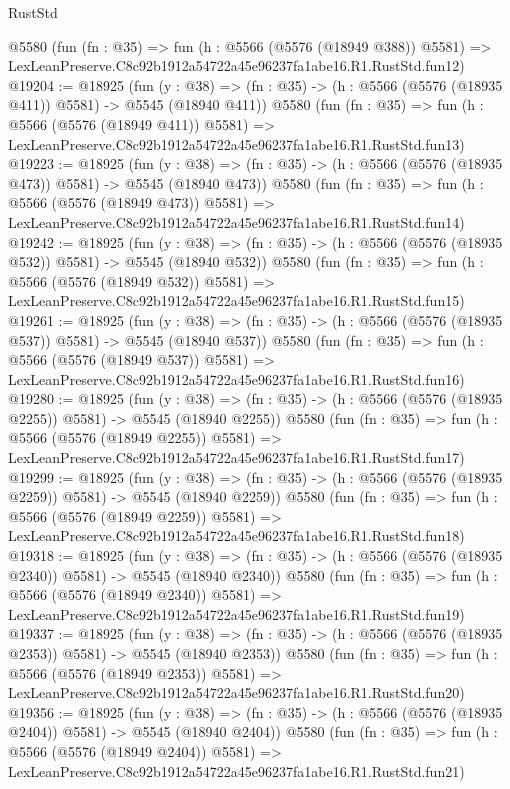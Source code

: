 \begin{lexlean}{RustStd}
\begin{coremodule}
    @5580
    (fun (fn : @35) =>
    fun (h : @5566 (@5576 (@18949 @388)) @5581) =>
    LexLeanPreserve.C8c92b1912a54722a45e96237fa1abe16.R1.RustStd.fun12)
@19204 := @18925
    (fun (y : @38) => (fn : @35) -> (h : @5566 (@5576 (@18935 @411)) @5581) -> @5545 (@18940 @411))
    @5580
    (fun (fn : @35) =>
    fun (h : @5566 (@5576 (@18949 @411)) @5581) =>
    LexLeanPreserve.C8c92b1912a54722a45e96237fa1abe16.R1.RustStd.fun13)
@19223 := @18925
    (fun (y : @38) => (fn : @35) -> (h : @5566 (@5576 (@18935 @473)) @5581) -> @5545 (@18940 @473))
    @5580
    (fun (fn : @35) =>
    fun (h : @5566 (@5576 (@18949 @473)) @5581) =>
    LexLeanPreserve.C8c92b1912a54722a45e96237fa1abe16.R1.RustStd.fun14)
@19242 := @18925
    (fun (y : @38) => (fn : @35) -> (h : @5566 (@5576 (@18935 @532)) @5581) -> @5545 (@18940 @532))
    @5580
    (fun (fn : @35) =>
    fun (h : @5566 (@5576 (@18949 @532)) @5581) =>
    LexLeanPreserve.C8c92b1912a54722a45e96237fa1abe16.R1.RustStd.fun15)
@19261 := @18925
    (fun (y : @38) => (fn : @35) -> (h : @5566 (@5576 (@18935 @537)) @5581) -> @5545 (@18940 @537))
    @5580
    (fun (fn : @35) =>
    fun (h : @5566 (@5576 (@18949 @537)) @5581) =>
    LexLeanPreserve.C8c92b1912a54722a45e96237fa1abe16.R1.RustStd.fun16)
@19280 := @18925
    (fun (y : @38) =>
    (fn : @35) -> (h : @5566 (@5576 (@18935 @2255)) @5581) -> @5545 (@18940 @2255))
    @5580
    (fun (fn : @35) =>
    fun (h : @5566 (@5576 (@18949 @2255)) @5581) =>
    LexLeanPreserve.C8c92b1912a54722a45e96237fa1abe16.R1.RustStd.fun17)
@19299 := @18925
    (fun (y : @38) =>
    (fn : @35) -> (h : @5566 (@5576 (@18935 @2259)) @5581) -> @5545 (@18940 @2259))
    @5580
    (fun (fn : @35) =>
    fun (h : @5566 (@5576 (@18949 @2259)) @5581) =>
    LexLeanPreserve.C8c92b1912a54722a45e96237fa1abe16.R1.RustStd.fun18)
@19318 := @18925
    (fun (y : @38) =>
    (fn : @35) -> (h : @5566 (@5576 (@18935 @2340)) @5581) -> @5545 (@18940 @2340))
    @5580
    (fun (fn : @35) =>
    fun (h : @5566 (@5576 (@18949 @2340)) @5581) =>
    LexLeanPreserve.C8c92b1912a54722a45e96237fa1abe16.R1.RustStd.fun19)
@19337 := @18925
    (fun (y : @38) =>
    (fn : @35) -> (h : @5566 (@5576 (@18935 @2353)) @5581) -> @5545 (@18940 @2353))
    @5580
    (fun (fn : @35) =>
    fun (h : @5566 (@5576 (@18949 @2353)) @5581) =>
    LexLeanPreserve.C8c92b1912a54722a45e96237fa1abe16.R1.RustStd.fun20)
@19356 := @18925
    (fun (y : @38) =>
    (fn : @35) -> (h : @5566 (@5576 (@18935 @2404)) @5581) -> @5545 (@18940 @2404))
    @5580
    (fun (fn : @35) =>
    fun (h : @5566 (@5576 (@18949 @2404)) @5581) =>
    LexLeanPreserve.C8c92b1912a54722a45e96237fa1abe16.R1.RustStd.fun21)

\end{coremodule}
\end{lexlean}
